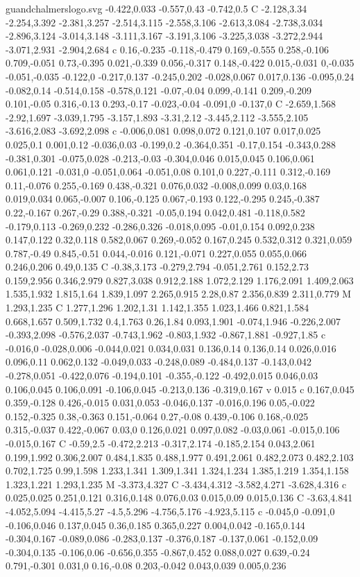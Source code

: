 \begin{filecontents}[noheader]{guandchalmerslogo.svg}
-0.422,0.033 -0.557,0.43 -0.742,0.5 C -2.128,3.34 -2.254,3.392 -2.381,3.257 -2.514,3.115 -2.558,3.106 -2.613,3.084 -2.738,3.034 -2.896,3.124 -3.014,3.148 -3.111,3.167 -3.191,3.106 -3.225,3.038 -3.272,2.944 -3.071,2.931 -2.904,2.684 c 0.16,-0.235 -0.118,-0.479 0.169,-0.555 0.258,-0.106 0.709,-0.051 0.73,-0.395 0.021,-0.339 0.056,-0.317 0.148,-0.422 0.015,-0.031 0,-0.035 -0.051,-0.035 -0.122,0 -0.217,0.137 -0.245,0.202 -0.028,0.067 0.017,0.136 -0.095,0.24 -0.082,0.14 -0.514,0.158 -0.578,0.121 -0.07,-0.04 0.099,-0.141 0.209,-0.209 0.101,-0.05 0.316,-0.13 0.293,-0.17 -0.023,-0.04 -0.091,0 -0.137,0 C -2.659,1.568 -2.92,1.697 -3.039,1.795 -3.157,1.893 -3.31,2.12 -3.445,2.112 -3.555,2.105 -3.616,2.083 -3.692,2.098 c -0.006,0.081 0.098,0.072 0.121,0.107 0.017,0.025 0.025,0.1 0.001,0.12 -0.036,0.03 -0.199,0.2 -0.364,0.351 -0.17,0.154 -0.343,0.288 -0.381,0.301 -0.075,0.028 -0.213,-0.03 -0.304,0.046 0.015,0.045 0.106,0.061 0.061,0.121 -0.031,0 -0.051,0.064 -0.051,0.08 0.101,0 0.227,-0.111 0.312,-0.169 0.11,-0.076 0.255,-0.169 0.438,-0.321 0.076,0.032 -0.008,0.099 0.03,0.168 0.019,0.034 0.065,-0.007 0.106,-0.125 0.067,-0.193 0.122,-0.295 0.245,-0.387 0.22,-0.167 0.267,-0.29 0.388,-0.321 -0.05,0.194 0.042,0.481 -0.118,0.582 -0.179,0.113 -0.269,0.232 -0.286,0.326 -0.018,0.095 -0.01,0.154 0.092,0.238 0.147,0.122 0.32,0.118 0.582,0.067 0.269,-0.052 0.167,0.245 0.532,0.312 0.321,0.059 0.787,-0.49 0.845,-0.51 0.044,-0.016 0.121,-0.071 0.227,0.055 0.055,0.066 0.246,0.206 0.49,0.135 C -0.38,3.173 -0.279,2.794 -0.051,2.761 0.152,2.73 0.159,2.956 0.346,2.979 0.827,3.038 0.912,2.188 1.072,2.129 1.176,2.091 1.409,2.063 1.535,1.932 1.815,1.64 1.839,1.097 2.265,0.915 2.28,0.87 2.356,0.839 2.311,0.779 M 1.293,1.235 C 1.277,1.296 1.202,1.31 1.142,1.355 1.023,1.466 0.821,1.584 0.668,1.657 0.509,1.732 0.4,1.763 0.26,1.84 0.093,1.901 -0.074,1.946 -0.226,2.007 -0.393,2.098 -0.576,2.037 -0.743,1.962 -0.803,1.932 -0.867,1.881 -0.927,1.85 c -0.016,0 -0.028,0.006 -0.044,0.021 0.034,0.031 0.136,0.14 0.136,0.14 0.026,0.016 0.096,0.11 0.062,0.132 -0.049,0.033 -0.248,0.089 -0.484,0.137 -0.143,0.042 -0.278,0.051 -0.422,0.076 -0.194,0.101 -0.355,-0.122 -0.492,0.015 0.046,0.03 0.106,0.045 0.106,0.091 -0.106,0.045 -0.213,0.136 -0.319,0.167 v 0.015 c 0.167,0.045 0.359,-0.128 0.426,-0.015 0.031,0.053 -0.046,0.137 -0.016,0.196 0.05,-0.022 0.152,-0.325 0.38,-0.363 0.151,-0.064 0.27,-0.08 0.439,-0.106 0.168,-0.025 0.315,-0.037 0.422,-0.067 0.03,0 0.126,0.021 0.097,0.082 -0.03,0.061 -0.015,0.106 -0.015,0.167 C -0.59,2.5 -0.472,2.213 -0.317,2.174 -0.185,2.154 0.043,2.061 0.199,1.992 0.306,2.007 0.484,1.835 0.488,1.977 0.491,2.061 0.482,2.073 0.482,2.103 0.702,1.725 0.99,1.598 1.233,1.341 1.309,1.341 1.324,1.234 1.385,1.219 1.354,1.158 1.323,1.221 1.293,1.235 M -3.373,4.327 C -3.434,4.312 -3.582,4.271 -3.628,4.316 c 0.025,0.025 0.251,0.121 0.316,0.148 0.076,0.03 0.015,0.09 0.015,0.136 C -3.63,4.841 -4.052,5.094 -4.415,5.27 -4.5,5.296 -4.756,5.176 -4.923,5.115 c -0.045,0 -0.091,0 -0.106,0.046 0.137,0.045 0.36,0.185 0.365,0.227 0.004,0.042 -0.165,0.144 -0.304,0.167 -0.089,0.086 -0.283,0.137 -0.376,0.187 -0.137,0.061 -0.152,0.09 -0.304,0.135 -0.106,0.06 -0.656,0.355 -0.867,0.452 0.088,0.027 0.639,-0.24 0.791,-0.301 0.031,0 0.16,-0.08 0.203,-0.042 0.043,0.039 0.005,0.236 
\end{filecontents}
